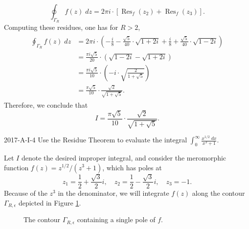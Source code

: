 \documentclass{article}
\begin{document}
	\begin{equation*}
		\oint_{\Gamma_{R}}f(z)\;dz = 2\pi i \cdot \left[\operatorname{Res}_{f}(z_{2}) + \operatorname{Res}_{f}(z_{3})\right]. 
	\end{equation*}
	Computing these residues, one has for $R > 2$, 
	\begin{align*}
		\begin{split}
			\oint_{\Gamma_{R}}f(z)\;dz &= 2\pi i \cdot \left(-\frac{i}{8} - \frac{\sqrt{5}}{40} \cdot \sqrt{1 + 2i} + \frac{i}{8} + \frac{\sqrt{5}}{40}\cdot \sqrt{1 - 2i}\right) \\
			&= \frac{\pi i \sqrt{5}}{20} \cdot \left(\sqrt{1 -2i} - \sqrt{1 + 2i}\right) \\
			&= \frac{\pi i \sqrt{5}}{10} \cdot \left(-i \cdot \sqrt{\frac{2}{1 + \sqrt{5}}}\right) \\
			&= \frac{\pi\sqrt{5}}{10} \cdot \frac{\sqrt{2}}{\sqrt{1 + \sqrt{5}}}. 
		\end{split}
	\end{align*}
	Therefore, we conclude that 
	\begin{equation*}
		I = \frac{\pi\sqrt{5}}{10} \cdot \frac{\sqrt{2}}{\sqrt{1 + \sqrt{5}}}. 
	\end{equation*}
	\begin{prb}{2017-A-I-4}
		Use the Residue Theorem to evaluate the integral $\int_{0}^{\infty}\frac{x^{1/2}\;dx}{x^{3} + 1}$. 
	\end{prb}
	Let $I$ denote the desired improper integral, and consider the meromorphic function $f(z) = z^{1/2}/(z^{3} + 1)$, which has poles at 
	\begin{equation*}
		z_{1} = \frac{1}{2} + \frac{\sqrt{3}}{2}i, \quad z_{2} = \frac{1}{2} - \frac{\sqrt{3}}{2}i, \quad z_{3} = -1. 
	\end{equation*}
	Because of the $z^{3}$ in the denominator, we will integrate $f(z)$ along the contour $\Gamma_{R, \epsilon}$ depicted in Figure  \ref{fig:2017AI4}.
	\begin{figure}[h!]
		\centering 
		\caption{The contour $\Gamma_{R, \epsilon}$ containing a single pole of $f$.}
		\label{fig:2017AI4}
	\end{figure}
\end{document}
